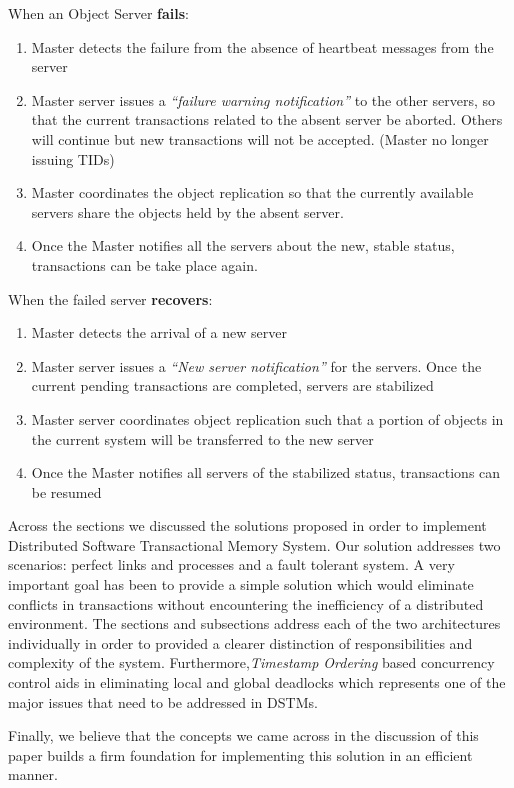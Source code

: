 \documentclass[times, 10pt,twocolumn]{article}
\begin{document}
When an Object Server {\bf fails}:
\begin{enumerate}
\item Master detects the failure from the absence of heartbeat messages from the server
\item Master server issues a {\it “failure warning notification”} to the other servers, so that the current transactions related to the absent server be aborted.
Others will continue but new transactions will not be accepted. (Master no longer issuing TIDs)
\item Master coordinates the object replication so that the currently available servers share the objects held by the absent server.
\item Once the Master notifies all the servers about the new, stable status, transactions can be take place again.\\
\end{enumerate}

When the failed server {\bf recovers}:
\begin{enumerate}
\item Master detects the arrival of a new server
\item Master server issues a {\it “New server notification”} for the servers. Once the current pending transactions are completed, servers are stabilized
\item Master server coordinates object replication such that a portion of objects in the current system will be transferred to the new server
\item Once the Master notifies all servers of the stabilized status, transactions can be resumed
\end{enumerate}

Across the sections we discussed the solutions proposed in order to implement Distributed Software Transactional Memory System.
Our solution addresses two scenarios: perfect links and processes and a fault tolerant system.
A very important goal has been to provide a simple solution which would eliminate conflicts in transactions without encountering the inefficiency of a distributed environment. 
The sections and subsections address each of the two architectures individually in order to provided a clearer distinction of responsibilities and complexity of the system.
Furthermore,{\it Timestamp Ordering} based concurrency control aids in eliminating local and global deadlocks which represents one of the major issues that need to be addressed in DSTMs.

Finally, we believe that the concepts we came across in the discussion of this paper builds a firm foundation for implementing this solution in an efficient manner.




\end{document}
